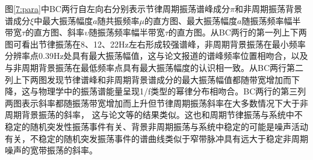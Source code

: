 图\ref{7:para}中BC两行自左向右分别表示节律周期振荡谱峰成分$\pi$和非周期振荡背景谱成分$\xi$中最大振荡幅度$a$随共振频率$\mu$的直方图、最大振荡幅度$a$随振荡频率幅半带宽$\tau$的直方图、斜率$\upsilon$随振荡频率幅半带宽$\tau$的直方图。从BC两行的第一列上下两图可看出节律振荡在8、12、22Hz左右形成较强谱峰，非周期背景振荡在最小频率分辨率点0.39Hz处具有最大振荡幅值，这与论文报道的谱峰频率位置相吻合，以及与非周期背景振荡在最低频率点具有最大振荡幅度的认识相一致。从BC两行第二列上下两图发现节律谱峰和非周期背景谱成分的最大振荡幅值都随带宽增加而下降，这与物理学中的振荡谱能量呈现1/f类型的幂律分布相吻合。BC两行的第三列两图表示斜率都随振荡带宽增加而上升但节律周期振荡斜率在大多数情况下大于非周期背景振荡的斜率，
这与论文等的结果类似。这也和周期节律振荡与系统中不稳定的随机突发性振荡事件有关、背景非周期振荡与系统中稳定的可能是噪声活动有关，不稳定的随机突发振荡事件的谱曲线类似于窄带脉冲具有远大于稳定非周期噪声的宽带振荡的斜率。

